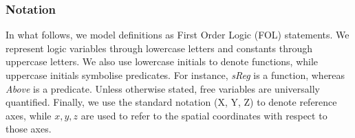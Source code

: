 \documentclass{article}
\begin{document}
\subsubsection{Notation} In what follows, we model definitions as First Order Logic (FOL) statements. We represent logic variables through lowercase letters and constants through uppercase letters. We also use lowercase initials to denote functions, while uppercase initials symbolise predicates. For instance, \textit{sReg} is a function, whereas \textit{Above} is a predicate. Unless otherwise stated, free variables are universally quantified.  Finally, we use the standard notation (X, Y, Z) to denote reference axes, while $x,y,z$ are used to refer to the spatial coordinates with respect to those axes. %
\end{document}
